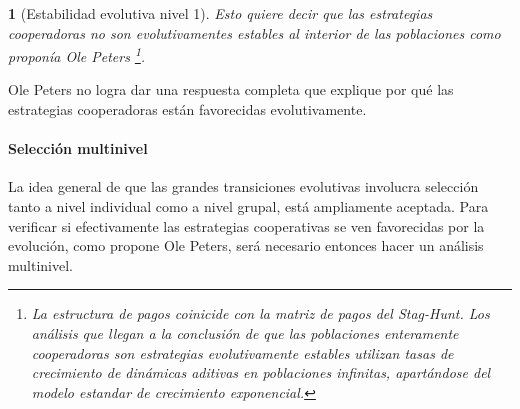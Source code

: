 \documentclass[a4paper,10pt]{article}
\newif\ifen
\newif\ifes
\newcommand{\en}[1]{\ifen#1\fi}
\newcommand{\es}[1]{\ifes#1\fi}
\newtheorem{conclution}{\en{Conclution}\es{Conclusión}}%
\begin{document}
\begin{conclution}[Estabilidad evolutiva nivel 1]
Esto quiere decir que las estrategias cooperadoras no son evolutivamentes estables al interior de las poblaciones como proponía Ole Peters \footnote{La estructura de pagos coinicide con la matriz de pagos del Stag-Hunt. Los análisis que llegan a la conclusión de que las poblaciones enteramente cooperadoras son estrategias evolutivamente estables utilizan tasas de crecimiento de dinámicas aditivas en poblaciones infinitas, apartándose del modelo estandar de crecimiento exponencial.}.
\end{conclution}
\begin{framed}
Ole Peters no logra dar una respuesta completa que explique por qué las estrategias cooperadoras están favorecidas evolutivamente.
\end{framed}


\paragraph{Selección multinivel} La idea general de que las grandes transiciones evolutivas involucra selección tanto a nivel individual como a nivel grupal, está ampliamente aceptada.
Para verificar si efectivamente las estrategias cooperativas se ven favorecidas por la evolución, como propone Ole Peters, será necesario entonces hacer un análisis multinivel.
\end{document}

